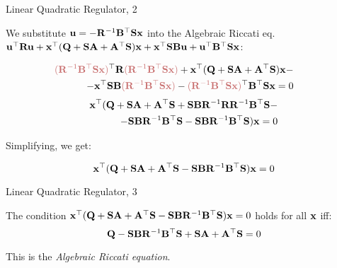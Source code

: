 \documentclass{beamer}
\begin{document}
\begin{frame}{Linear Quadratic Regulator, 2}
	\begin{flushleft}
		
		We substitute $\mathbf{u} = -\mathbf{R}^{-1} \mathbf{B}^\top \mathbf{S} \mathbf{x}$ into the Algebraic Riccati eq.  $\mathbf{u}^\top \mathbf{R} \mathbf{u}
		+ 
		\mathbf{x}^\top (
		\mathbf{Q} + \mathbf{S} \mathbf{A} + \mathbf{A}^\top \mathbf{S}
		)\mathbf{x}
		+ 
		\mathbf{x}^\top \mathbf{S} \mathbf{B} \mathbf{u} 
		+ \mathbf{u}^\top \mathbf{B}^\top \mathbf{S} \mathbf{x}$:
		
		\begin{align*}
			\hspace*{-0.7cm}
			\textcolor{myred}{(\bo{R}^{-1} \bo{B}^\top \bo{S} \bo{x})}^\top \bo{R} \textcolor{myred}{(\bo{R}^{-1} \bo{B}^\top \bo{S} \bo{x})}
			+ 
			\bo{x}^\top (
			\bo{Q} + \bo{S} \bo{A} + \bo{A}^\top \bo{S}
			)\bo{x}
			- 
			\\
			-
			\bo{x}^\top \bo{S} \bo{B} \textcolor{myred}{(\bo{R}^{-1} \bo{B}^\top \bo{S} \bo{x})}
			- 
			\textcolor{myred}{(\bo{R}^{-1} \bo{B}^\top \bo{S} \bo{x})}^\top \bo{B}^\top \bo{S} \bo{x} = 0
			\\
		\end{align*}
		\begin{align*}
				\mathbf{x}^\top (
				\mathbf{Q} + \mathbf{S} \mathbf{A} + \mathbf{A}^\top \mathbf{S}
				+
				 \mathbf{S} \mathbf{B} \mathbf{R}^{-1} \mathbf{R} \mathbf  R^{-1} \mathbf{B}^\top \mathbf{S} -
				 \\
				 - \mathbf{S} \mathbf{B} \mathbf{R}^{-1} \mathbf{B}^\top \mathbf{S} 
				 - \mathbf{S} \mathbf{B} \mathbf{R}^{-1} \mathbf{B}^\top \mathbf{S} 
				 )  \mathbf{x} 
				= 0
		\end{align*}
		
		Simplifying, we get: 
		
		\begin{equation}
			\mathbf{x}^\top (\mathbf{Q} + \mathbf{S} \mathbf{A} + \mathbf{A}^\top \mathbf{S}
			- \mathbf{S} \mathbf{B} \mathbf{R}^{-1} \mathbf{B}^\top \mathbf{S}) \mathbf{x} = 0
		\end{equation}
		
		
	\end{flushleft}
\end{frame}



\begin{frame}{Linear Quadratic Regulator, 3}
\begin{flushleft}

The condition $\mathbf{x}^\top (\mathbf{Q} + \mathbf{S} \mathbf{A} + \mathbf{A}^\top \mathbf{S}
- \mathbf{S} \mathbf{B} \mathbf{R}^{-1} \mathbf{B}^\top \mathbf{S}) \mathbf{x} = 0$ holds for all $\mathbf{x}$ iff:
%
\begin{equation}
	\mathbf{Q} - \mathbf{S} \mathbf{B} \mathbf{R}^{-1} \mathbf{B}^\top \mathbf{S} 
	+ \mathbf{S} \mathbf{A} + \mathbf{A}^\top \mathbf{S} = 0
\end{equation}

This is the \emph{Algebraic Riccati equation}.

\end{flushleft}
\end{frame}
\end{document}
